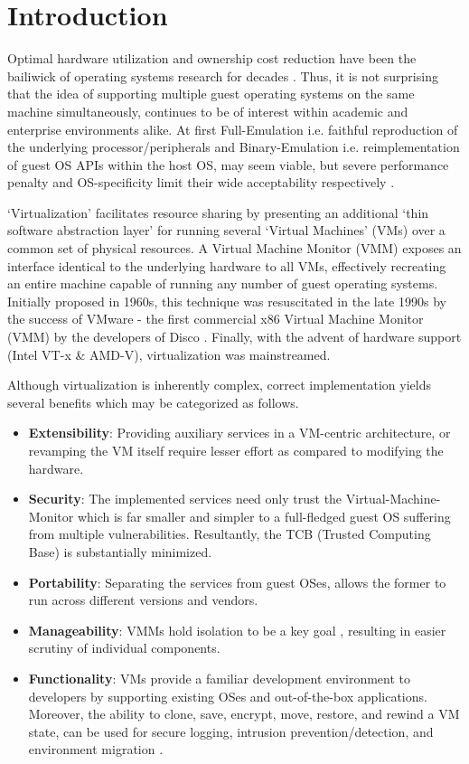 \section{Introduction}

Optimal hardware utilization and ownership cost reduction have been the bailiwick of operating systems research for decades \cite{nova}. Thus, it is not surprising that the idea of supporting multiple guest operating systems on the same machine simultaneously, continues to be of interest within academic and enterprise environments alike. At first Full-Emulation i.e. faithful reproduction of the underlying processor/peripherals and Binary-Emulation i.e. reimplementation of guest OS APIs within the host OS, may seem viable, but severe performance penalty and OS-specificity limit their wide acceptability respectively \cite{coffing1999x86}. 

`Virtualization' facilitates resource sharing by presenting an additional `thin software abstraction layer' for running several `Virtual Machines' (VMs) over a common set of physical resources. A Virtual Machine Monitor (VMM) exposes an interface identical to the underlying hardware to all VMs, effectively recreating an entire machine capable of running any number of guest operating systems. Initially proposed in 1960s, this technique was resuscitated in the late 1990s by the success of VMware - the first commercial x86 Virtual Machine Monitor (VMM) by the developers of Disco \cite{bugnion1997disco} \cite{coffing1999x86}. Finally, with the advent of hardware support (Intel VT-x \& AMD-V), virtualization was mainstreamed.

Although virtualization is inherently complex, correct implementation yields several benefits which may be categorized as follows.

\begin{itemize}
\item \textbf{Extensibility}: Providing auxiliary services in a VM-centric architecture, or revamping the VM itself require lesser effort as compared to modifying the hardware. 
\item \textbf{Security}: The implemented services need only trust the Virtual-Machine-Monitor \cite{vmm} which is far smaller and simpler to a full-fledged guest OS suffering from multiple vulnerabilities. Resultantly, the TCB (Trusted Computing Base) is substantially minimized.
\item \textbf{Portability}: Separating the services from guest OSes, allows the former to run across different versions and vendors.
\item \textbf{Manageability}: VMMs hold isolation to be a key goal \cite{vmmmk}, resulting in easier scrutiny of individual components.  
\item \textbf{Functionality}: VMs provide a familiar development environment to developers by supporting existing OSes and out-of-the-box applications. Moreover, the ability to clone, save, encrypt, move, restore, and rewind a VM state, can be used for secure logging, intrusion prevention/detection, and environment migration \cite{clark2005live} \cite{dunlap2002revirt} \cite{king2005debugging} \cite{whitaker2004configuration}.
\end{itemize}

